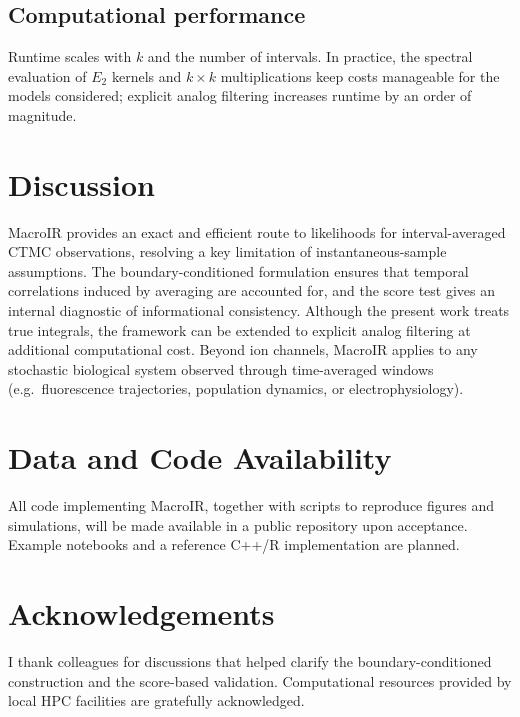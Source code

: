 \documentclass[9pt]{elife}
\begin{document}
\subsection*{Computational performance}
Runtime scales with $k$ and the number of intervals. In practice, the spectral evaluation of $E_2$ kernels and $k\times k$ multiplications keep costs manageable for the models considered; explicit analog filtering increases runtime by an order of magnitude.


\section*{Discussion}
MacroIR provides an exact and efficient route to likelihoods for interval-averaged CTMC observations, resolving a key limitation of instantaneous-sample assumptions. The boundary-conditioned formulation ensures that temporal correlations induced by averaging are accounted for, and the score test gives an internal diagnostic of informational consistency. Although the present work treats true integrals, the framework can be extended to explicit analog filtering at additional computational cost. Beyond ion channels, MacroIR applies to any stochastic biological system observed through time-averaged windows (e.g.\ fluorescence trajectories, population dynamics, or electrophysiology).

\section*{Data and Code Availability}
All code implementing MacroIR, together with scripts to reproduce figures and simulations, will be made available in a public repository upon acceptance. Example notebooks and a reference C++/R implementation are planned.

\section*{Acknowledgements}
I thank colleagues for discussions that helped clarify the boundary-conditioned construction and the score-based validation. Computational resources provided by local HPC facilities are gratefully acknowledged.
\end{document}
